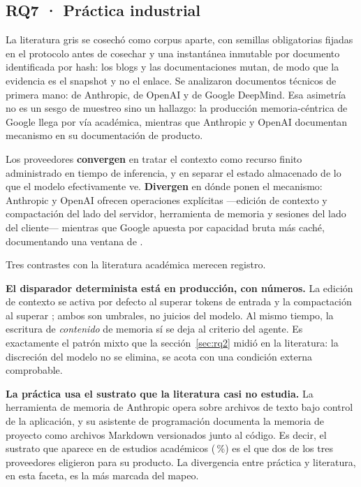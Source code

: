 \documentclass[conference]{IEEEtran}
\begin{document}
\subsection{RQ7 · Práctica industrial}
\label{sec:rq7}

La literatura gris se cosechó como corpus aparte, con semillas obligatorias fijadas en el protocolo
antes de cosechar y una instantánea inmutable por documento identificada por hash: los blogs y las
documentaciones mutan, de modo que la evidencia es el snapshot y no el enlace. Se analizaron
\clGrisDocs{} documentos técnicos de primera mano: \clGrisAnthropic{} de Anthropic,
\clGrisOpenAI{} de OpenAI y \clGrisGoogle{} de Google DeepMind. Esa asimetría no es un sesgo de
muestreo sino un hallazgo: la producción memoria-céntrica de Google llega por vía académica, mientras
que Anthropic y OpenAI documentan mecanismo en su documentación de producto.

Los proveedores \textbf{convergen} en tratar el contexto como recurso finito administrado en tiempo
de inferencia, y en separar el estado almacenado de lo que el modelo efectivamente ve.
\textbf{Divergen} en dónde ponen el mecanismo: Anthropic y OpenAI ofrecen operaciones explícitas
—edición de contexto y compactación del lado del servidor, herramienta de memoria y sesiones del lado
del cliente— mientras que Google apuesta por capacidad bruta más caché, documentando una ventana de
\clGrisVentanaGemini{}.

Tres contrastes con la literatura académica merecen registro.

\textbf{El disparador determinista está en producción, con números.} La edición de contexto se activa
por defecto al superar \clGrisUmbralEdicion{} tokens de entrada y la compactación al superar
\clGrisUmbralCompactacion{}; ambos son umbrales, no juicios del modelo. Al mismo tiempo, la escritura
de \emph{contenido} de memoria sí se deja al criterio del agente. Es exactamente el patrón mixto que
la sección~\ref{sec:rq2} midió en la literatura: la discreción del modelo no se elimina, se acota con
una condición externa comprobable.

\textbf{La práctica usa el sustrato que la literatura casi no estudia.} La herramienta de memoria de
Anthropic opera sobre archivos de texto bajo control de la aplicación, y su asistente de programación
documenta la memoria de proyecto como archivos Markdown versionados junto al código. Es decir, el
sustrato que aparece en \clMFdocsVersionado{} de \clCarAnalizados{} estudios académicos
(\clMFdocsVersionadoPct{}\,\%) es el que dos de los tres proveedores eligieron para su producto. La
divergencia entre práctica y literatura, en esta faceta, es la más marcada del mapeo.
\end{document}
